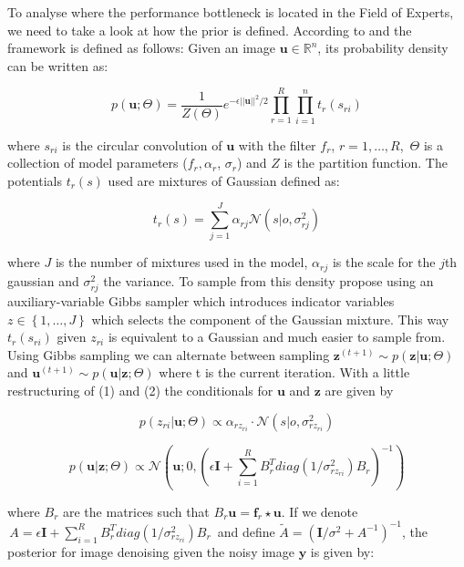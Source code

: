 \documentclass{article}
\begin{document}
To analyse where the performance bottleneck is located in the Field of 
Experts, we need to take a look at how the prior is defined. According 
to \citep{stefan} and \citep{uwe} the framework is defined as follows: 
Given an image $\textbf{u} \in \mathbb{R}^n$, its probability density 
can be written as:

\begin{equation}
	p(\textbf{u}; \Theta) = 
	\frac{1}{Z(\Theta)}e^{-\epsilon||\textbf{u}||^2/2} \prod_{r=1}^{R} 
	\prod_{i=1}^{n} t_r(s_{ri})
\end{equation}

where $s_{ri}$ is the circular convolution of $\textbf{u}$ with the 
filter $f_r$, $r = 1, \ldots , R$, $\,\Theta$ is a collection of model 
parameters ($f_r, \alpha_r$, $\sigma_r$) and $Z$ is the partition 
function.  The potentials $t_r(s)$ used are mixtures of Gaussian defined 
as:

\begin{equation}
	t_r(s) = \sum_{j=1}^{J} \alpha_{rj}\mathcal{N}(s|o, \sigma^2_{rj})
\end{equation}

where $J$ is the number of mixtures used in the model, $\alpha_{rj}$ is 
the scale for the $j$th gaussian and $\sigma^2_{rj}$ the variance. To 
sample from this density \citep{uwe} propose using an auxiliary-variable 
Gibbs sampler which introduces indicator variables $z \in \left\{1, 
\ldots, J\right\}$ which selects the component of the Gaussian mixture.  
This way $t_r(s_{ri})$ given $z_{ri}$ is equivalent to a Gaussian and 
much easier to sample from. Using Gibbs sampling we can alternate 
between sampling $\textbf{z}^{(t + 1)} \sim 
p(\textbf{z}|\textbf{u};\Theta)$ and $\textbf{u}^{(t + 1)} \sim 
p(\textbf{u}|\textbf{z};\Theta)$ where t is the current iteration.  With 
a little restructuring of (1) and (2) the conditionals for $\textbf{u}$
and $\textbf{z}$ are given by

\begin{equation}
	p(z_{ri}|\textbf{u};\Theta) \propto \alpha_{rz_{ri}} \cdot 
\mathcal{N}(s|o, \sigma^2_{rz_{ri}})
\end{equation}

\begin{equation}
	p(\textbf{u}|\textbf{z};\Theta) \propto \mathcal{N}\left(\textbf{u}; 
	0, \left( \epsilon \textbf{I} + \sum_{i=1}^{R}B_r^T 
	diag(1/\sigma^2_{rz_{ri}}) B_r \right)^{-1} \right)
\end{equation}

where $B_r$ are the matrices such that $B_r \textbf{u} = \textbf{f}_r 
\star \textbf{u}$. If we denote $\,A = \epsilon \textbf{I} + 
\sum_{i=1}^{R} B_r^T diag(1/\sigma^2_{rz_{ri}}) B_r\,$ and define 
$\tilde{A} = (\textbf{I}/\sigma^2 + A^{-1})^{-1}$, the posterior for 
image denoising given the noisy image $\textbf{y}$ is given by:
\end{document}
